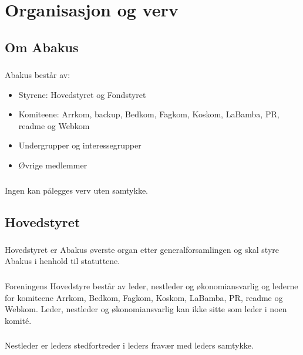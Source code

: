 \section{Organisasjon og verv}
\subsection{Om Abakus}

\subsubsection{}
Abakus består av:

\begin{itemize}
\item Styrene: Hovedstyret og Fondstyret
\item Komiteene: Arrkom, backup, Bedkom, Fagkom, Koskom, LaBamba, PR, readme og Webkom
\item Undergrupper og interessegrupper
\item Øvrige medlemmer
\end{itemize}

\subsubsection{}
Ingen kan pålegges verv uten samtykke.

\subsection{Hovedstyret}

\subsubsection{}
Hovedstyret er Abakus øverste organ etter generalforsamlingen og skal styre
Abakus i henhold til statuttene.

\subsubsection{}
Foreningens Hovedstyre består av leder, nestleder og økonomiansvarlig og
lederne for komiteene Arrkom, Bedkom, Fagkom, Koskom, LaBamba, PR, readme og Webkom.
Leder, nestleder og økonomiansvarlig kan ikke sitte som leder i noen komité.

\subsubsection{}
Nestleder er leders stedfortreder i leders fravær med leders samtykke.


